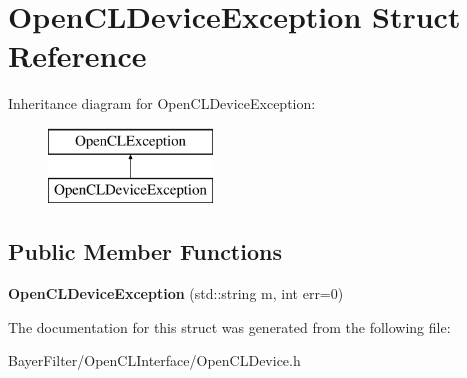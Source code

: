 \hypertarget{struct_open_c_l_device_exception}{\section{Open\-C\-L\-Device\-Exception Struct Reference}
\label{struct_open_c_l_device_exception}
}
Inheritance diagram for Open\-C\-L\-Device\-Exception\-:\begin{figure}[H]
\begin{center}
\leavevmode
\includegraphics[height=2.000000cm]{struct_open_c_l_device_exception}
\end{center}
\end{figure}
\subsection*{Public Member Functions}
\begin{DoxyCompactItemize}
\item 
\hypertarget{struct_open_c_l_device_exception_a93a452a2d46c4267492e2c67dcef17fa}{{\bfseries Open\-C\-L\-Device\-Exception} (std\-::string m, int err=0)}\label{struct_open_c_l_device_exception_a93a452a2d46c4267492e2c67dcef17fa}

\end{DoxyCompactItemize}


The documentation for this struct was generated from the following file\-:\begin{DoxyCompactItemize}
\item 
Bayer\-Filter/\-Open\-C\-L\-Interface/Open\-C\-L\-Device.\-h\end{DoxyCompactItemize}
